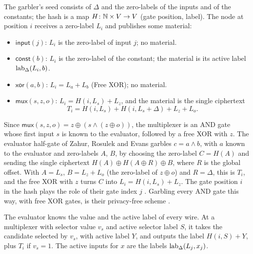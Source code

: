 \begin{definition}[Garbling]
  \label{def:garble}
  \leanok
  The garbler's seed consists of $\Delta$ and the zero-labels of the inputs and of the
  constants; the hash is a map $H \colon \mathbb{N} \times V \to V$ (gate position, label). The node at
  position $i$ receives a zero-label $L_i$ and publishes some material:
  \begin{itemize}
    \item $\mathsf{input}(j)$: $L_i$ is the zero-label of input $j$; no material.
    \item $\mathsf{const}(b)$: $L_i$ is the zero-label of the constant; the material is its
    active label $\operatorname{lab}_\Delta(L_i, b)$.
    \item $\mathsf{xor}(a, b)$: $L_i = L_a + L_b$ (Free XOR); no material.
    \item $\mathsf{mux}(s, z, o)$: $L_i = H(i, L_s) + L_z$, and the material is the single
    ciphertext
    \[ T_i = H(i, L_s) + H(i, L_s + \Delta) + L_z + L_o . \]
  \end{itemize}
\end{definition}

\begin{remark}
  \label{rem:mux-half-gate}
  Since $\mathsf{mux}(s, z, o) = z \oplus (s \wedge (z \oplus o))$, the multiplexer is an AND
  gate whose first input $s$ is known to the evaluator, followed by a free XOR with $z$. The
  evaluator half-gate of Zahur, Rosulek and Evans \cite[Sect.~3.1]{ZRE15} garbles $c = a \wedge b$,
  with $a$ known to the evaluator and zero-labels $A$, $B$, by choosing the zero-label $C = H(A)$
  and sending the single ciphertext $H(A) \oplus H(A \oplus R) \oplus B$, where $R$ is the global
  offset. With $A = L_s$, $B = L_z + L_o$ (the zero-label of $z \oplus o$) and $R = \Delta$, this is
  $T_i$, and the free XOR with $z$ turns $C$ into $L_i = H(i, L_s) + L_z$. The gate position $i$ in
  the hash plays the role of their gate index $j$ \cite[Sect.~3.2]{ZRE15}. Garbling every AND gate this way, with free XOR
  gates, is their privacy-free scheme \cite[Sect.~6]{ZRE15}.
\end{remark}

\begin{definition}[Evaluation]
  \label{def:eval}
  \leanok
  The evaluator knows the value and the active label of every wire. At a multiplexer with
  selector value $v_s$ and active selector label $S$, it takes the candidate selected by $v_s$,
  with active label $Y$, and outputs the label $H(i, S) + Y$, plus $T_i$ if $v_s = 1$. The active
  inputs for $x$ are the labels $\operatorname{lab}_\Delta(L_j, x_j)$.
\end{definition}

